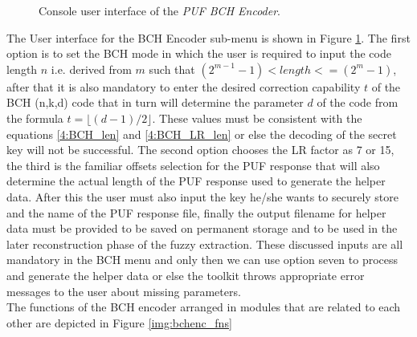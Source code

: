 	\begin{figure}
	\centering
	\caption{Console user interface of the \emph{PUF BCH Encoder}.}
	\label{img:4_BCH_ENC_menu}
	\end{figure}
	The User interface for the BCH Encoder sub-menu is shown in Figure \ref{img:4_BCH_ENC_menu}. The first option is to set the BCH mode in which the user is required to input the code length $n$ i.e. derived from $m$ such that $(2^{m-1} - 1) < length <= (2^m - 1)$, after that it is also mandatory to enter the desired correction capability $t$ of the BCH (n,k,d) code that in turn will determine the parameter $d$ of the code from the formula $t = \lfloor(d-1)/2\rfloor$.
	These values must be consistent with the equations \ref{4:BCH_len} and \ref{4:BCH_LR_len} or else the decoding of the secret key will not be successful. The second option chooses the LR factor as 7 or 15, the third is the familiar offsets selection for the PUF response that will also determine the actual length of the PUF response used to generate the helper data. After this the user must also input the key he/she wants to securely store and the name of the PUF
	response file, finally the output filename for helper data must be provided to be saved on permanent storage and to be used in the later reconstruction phase of the fuzzy extraction. These discussed inputs are all mandatory in the BCH menu and only then we can use option seven to process and generate the helper data or else the toolkit throws appropriate error messages to the user about missing parameters.\\

	The functions of the BCH encoder arranged in modules that are related to each other are depicted in Figure \ref{img:bchenc_fns}

